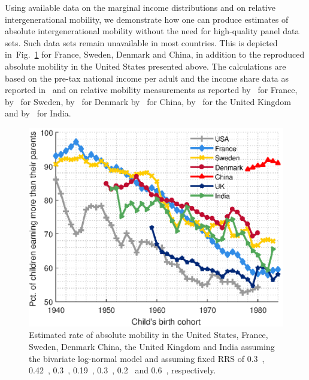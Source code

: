 \documentclass[12pt,a4paper]{article}
\newcommand{\flabel}[1]{\label{fig:#1}}
\newcommand{\fref}[1]{Fig.~\ref{fig:#1}}
\numberwithin{equation}{section}
\begin{document}
Using available data on the marginal income distributions and on relative intergenerational mobility, we demonstrate how one can produce estimates of absolute intergenerational mobility without the need for high-quality panel data sets. Such data sets remain unavailable in most countries. This is depicted in~\fref{countries} for France, Sweden, Denmark and China, in addition to the reproduced absolute mobility in the United States presented above. The calculations are based on the pre-tax national income per adult and the income share data as reported in~\citet{WID2017} and on relative mobility measurements as reported by~\citet{lefranc2005intergenerational} for France, by~\citet{bjorklund1997intergenerational} for Sweden, by~\citet{landerso2016scandinavian} for Denmark by~\citet{fan2015great} for China, by~\citet{jantti2006american} for the United Kingdom and by~\citet{hnatkovska2013breaking} for India.

\begin{figure}[!htb]
\centering
\includegraphics[width=1.0\textwidth] {./figs/countries4.eps}
\caption{Estimated rate of absolute mobility in the United States, France, Sweden, Denmark China, the United Kingdom and India assuming the bivariate log-normal model and assuming fixed RRS of 0.3~\citep{chetty2014land}, 0.42~\citep{lefranc2005intergenerational}, 0.3~\citep{bjorklund1997intergenerational}, 0.19~\citep{landerso2016scandinavian}, 0.3~\citep{fan2015great}, 0.2~\citep{jantti2006american} and 0.6~\citep{hnatkovska2013breaking}, respectively.}
\flabel{countries}
\end{figure}
\end{document}
